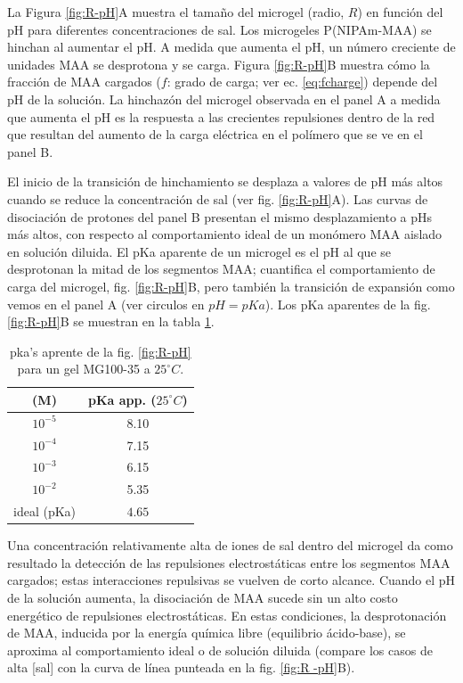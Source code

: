 La Figura \ref{fig:R-pH}A muestra el tama\~no del microgel (radio, $R$) en funci\'on del pH para diferentes concentraciones de sal.
Los microgeles P(NIPAm-MAA) se hinchan al aumentar el pH.
A medida que aumenta el pH, un n\'umero creciente de unidades MAA se desprotona y se carga.
Figura \ref{fig:R-pH}B muestra c\'omo la fracci\'on de MAA cargados ($f$: grado de carga; ver ec. \ref{eq:fcharge}) depende del pH de la soluci\'on.
La hinchaz\'on del microgel observada en el panel A a medida que aumenta el pH es la respuesta a las crecientes repulsiones dentro de la red que resultan del aumento de la carga el\'ectrica en el pol\'imero que se ve en el panel B.


El inicio de la transici\'on de hinchamiento se desplaza a valores de pH m\'as altos cuando se reduce la concentraci\'on de sal (ver fig. \ref{fig:R-pH}A).
Las curvas de disociaci\'on de protones del panel B presentan el mismo desplazamiento a pHs m\'as altos, con respecto al comportamiento ideal de un mon\'omero MAA aislado en soluci\'on diluida.
El pKa aparente de un microgel es el pH al que se desprotonan la mitad de los segmentos MAA;
cuantifica el comportamiento de carga del microgel, fig. \ref{fig:R-pH}B, pero tambi\'en la transici\'on de expansi\'on como vemos en el panel A (ver circulos en $pH=pKa$).
Los pKa aparentes de la fig. \ref{fig:R-pH}B se muestran en la tabla \ref{table:pKa_app}.

\begin{table}[!htb]
\small
  \begin{tabular}{|cc|}
    \hline
      [NaCl] (M)&  pKa app. ($25 ^\circ C$)  \\
      \hline
    $10^{-5}$ & 8.10  \\
    $10^{-4}$ & 7.15 \\
    $10^{-3}$ & 6.15 \\
    $10^{-2}$ & 5.35 \\
    ideal (pKa) &  $4.65$  \\
    \hline
  \end{tabular}
 \caption{ pka's aprente de la fig. \ref{fig:R-pH} para un gel MG100-35 a $25 ^\circ C$.}
\label{table:pKa_app} 
\end{table}


Una concentraci\'on relativamente alta de iones de sal dentro del microgel da como resultado la detecci\'on de las repulsiones electrost\'aticas entre los segmentos MAA cargados; estas interacciones repulsivas se vuelven de corto alcance.
Cuando el pH de la soluci\'on aumenta, la disociación de MAA sucede sin un alto costo energ\'etico de repulsiones electrost\'aticas.
En estas condiciones, la desprotonaci\'on de MAA, inducida por la energ\'ia qu\'imica libre (equilibrio \'acido-base), se aproxima al comportamiento ideal o de soluci\'on diluida (compare los casos de alta [sal] con la curva de l\'inea punteada en la fig. \ref{fig:R -pH}B).



